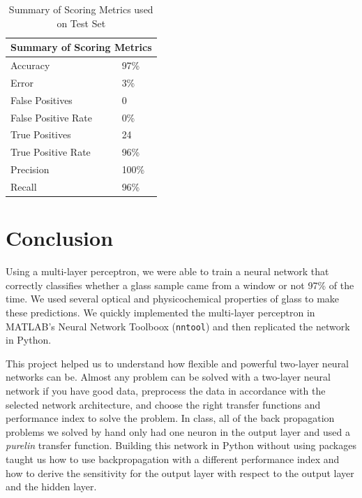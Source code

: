 \documentclass[12pt,halfline,a4paper]{ouparticle}
\begin{document}
\begin{table}[H]
\centering
\begin{tabular}{|l|l|}
\hline
\multicolumn{2}{|l|}{Summary of Scoring Metrics} \\ \hline
Accuracy                       & 97\%            \\ \hline
Error                          & 3\%             \\ \hline
False Positives                & 0               \\ \hline
False Positive Rate            & 0\%             \\ \hline
True Positives                 & 24              \\ \hline
True Positive Rate             & 96\%            \\ \hline
Precision                      & 100\%           \\ \hline
Recall                         & 96\%            \\ \hline
\end{tabular}
\caption{Summary of Scoring Metrics used on Test Set}
\label{my-label}
\end{table}

\section{Conclusion}
\label{sec7}

Using a multi-layer perceptron, we were able to train a neural network that correctly classifies whether a glass sample came from a window or not 97\% of the time. We used several optical and physicochemical properties of glass to make these predictions. We quickly implemented the multi-layer perceptron in MATLAB's Neural Network Toolboox (\verb|nntool|) and then replicated the network in Python. 

This project helped us to understand how flexible and powerful two-layer neural networks can be. Almost any problem can be solved with a two-layer neural network if you have good data, preprocess the data in accordance with the selected network architecture, and choose the right transfer functions and performance index to solve the problem. In class, all of the back propagation problems we solved by hand only had one neuron in the output layer and used a \emph{purelin} transfer function. Building this network in Python without using packages taught us how to use backpropagation with a different performance index and how to derive the sensitivity for the output layer with respect to the output layer and the hidden layer. 
\end{document}

